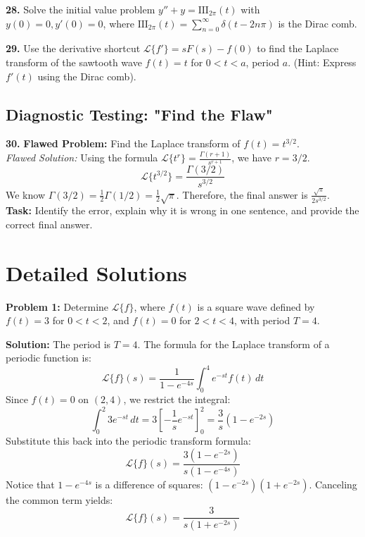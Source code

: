 \documentclass[11pt, letterpaper]{article}
\theoremstyle{definition}
\theoremstyle{remark}
\begin{document}
\textbf{28.} Solve the initial value problem $y'' + y = \text{III}_{2\pi}(t)$ with $y(0) = 0, y'(0) = 0$, where $\text{III}_{2\pi}(t) = \sum_{n=0}^\infty \delta(t - 2n\pi)$ is the Dirac comb.

\textbf{29.} Use the derivative shortcut $\mathcal{L}\{f'\} = sF(s) - f(0)$ to find the Laplace transform of the sawtooth wave $f(t) = t$ for $0 < t < a$, period $a$. (Hint: Express $f'(t)$ using the Dirac comb).

\subsection{Diagnostic Testing: "Find the Flaw"}
\textbf{30.} \textbf{Flawed Problem:} Find the Laplace transform of $f(t) = t^{3/2}$. \\
\textit{Flawed Solution:} Using the formula $\mathcal{L}\{t^r\} = \frac{\Gamma(r+1)}{s^{r+1}}$, we have $r = 3/2$.
\[ \mathcal{L}\{t^{3/2}\} = \frac{\Gamma(3/2)}{s^{3/2}} \]
We know $\Gamma(3/2) = \frac{1}{2}\Gamma(1/2) = \frac{1}{2}\sqrt{\pi}$. Therefore, the final answer is $\frac{\sqrt{\pi}}{2s^{3/2}}$. \\
\textbf{Task:} Identify the error, explain why it is wrong in one sentence, and provide the correct final answer.

\newpage
\section{Detailed Solutions}

\textbf{Problem 1:} Determine $\mathcal{L}\{f\}$, where $f(t)$ is a square wave defined by $f(t) = 3$ for $0 < t < 2$, and $f(t) = 0$ for $2 < t < 4$, with period $T = 4$.

\textbf{Solution:}
The period is $T = 4$. The formula for the Laplace transform of a periodic function is:
\[ \mathcal{L}\{f\}(s) = \frac{1}{1 - e^{-4s}} \int_0^4 e^{-st} f(t) \,dt \]
Since $f(t) = 0$ on $(2, 4)$, we restrict the integral:
\[ \int_0^2 3 e^{-st} \,dt = 3 \left[ -\frac{1}{s} e^{-st} \right]_0^2 = \frac{3}{s} (1 - e^{-2s}) \]
Substitute this back into the periodic transform formula:
\[ \mathcal{L}\{f\}(s) = \frac{3(1 - e^{-2s})}{s(1 - e^{-4s})} \]
Notice that $1 - e^{-4s}$ is a difference of squares: $(1 - e^{-2s})(1 + e^{-2s})$. Canceling the common term yields:
\[ \mathcal{L}\{f\}(s) = \frac{3}{s(1 + e^{-2s})} \]
\end{document}
